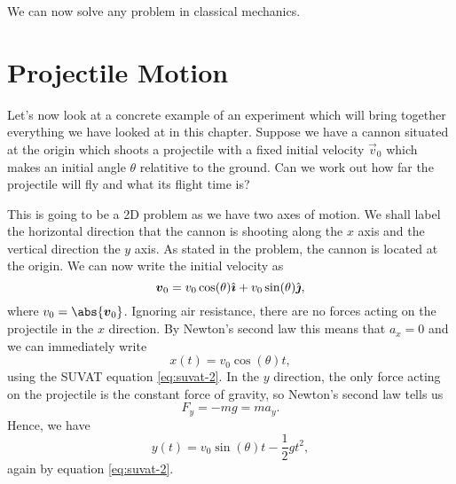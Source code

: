\documentclass[../classical_mechanics.tex]{subfiles}
\begin{document}
        We can now solve any problem in classical mechanics.

    \section{Projectile Motion}\label{sec:projectile-motion}
        Let's now look at a concrete example of an experiment which will bring together everything we have looked at in this chapter.
        Suppose we have a cannon situated at the origin which shoots a projectile with a fixed initial velocity $\vec{v}_0$ which makes an initial angle $\theta$ relatitive to the ground.
        Can we work out how far the projectile will fly and what its flight time is?

        This is going to be a 2D problem as we have two axes of motion.
        We shall label the horizontal direction that the cannon is shooting along the $x$ axis and the vertical direction the $y$ axis.
        As stated in the problem, the cannon is located at the origin.
        We can now write the initial velocity as
        \begin{equation}
            \boldsymbol{v}_0 = v_0\cos(\theta)\hat{\boldsymbol{\imath}} + v_0\sin(\theta)\hat{\boldsymbol{\jmath}},
        \end{equation}
        where $v_0=\abs{\vec{v}_0}$.
        Ignoring air resistance, there are no forces acting on the projectile in the $x$ direction.
        By Newton's second law this means that $a_x=0$ and we can immediately write
        \begin{equation}
            x(t) = v_0\cos(\theta)t,
        \end{equation}
        using the SUVAT equation \ref{eq:suvat-2}.
        In the $y$ direction, the only force acting on the projectile is the constant force of gravity, so Newton's second law tells us
        \begin{equation}
            F_y = -mg = ma_y.
        \end{equation}
        Hence, we have
        \begin{equation}
            y(t) = v_0\sin(\theta)t - \frac{1}{2}gt^2,
        \end{equation}
        again by equation \ref{eq:suvat-2}.
\end{document}
